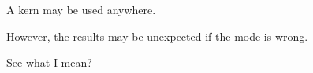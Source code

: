 A kern may be used \kern0.25in anywhere.\par
\kern0.25in However, the results may be unexpected if the mode is wrong.\par
\noindent\kern0.25in See what I mean?
\bye

